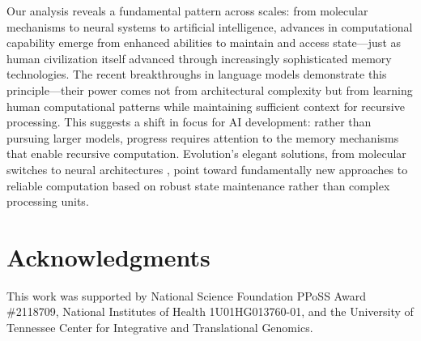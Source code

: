 \documentclass[12pt]{article}
\begin{document}
Our analysis reveals a fundamental pattern across scales: from molecular mechanisms to neural systems to artificial intelligence, advances in computational capability emerge from enhanced abilities to maintain and access state---just as human civilization itself advanced through increasingly sophisticated memory technologies.
The recent breakthroughs in language models demonstrate this principle---their power comes not from architectural complexity but from learning human computational patterns while maintaining sufficient context for recursive processing.
This suggests a shift in focus for AI development: rather than pursuing larger models, progress requires attention to the memory mechanisms that enable recursive computation.
Evolution's elegant solutions, from molecular switches to neural architectures \cite{burrill2010making}, point toward fundamentally new approaches to reliable computation based on robust state maintenance rather than complex processing units.

\section*{Acknowledgments}
This work was supported by National Science Foundation PPoSS Award \#2118709, National Institutes of Health 1U01HG013760-01, and the University of Tennessee Center for Integrative and Translational Genomics.

\begingroup
\footnotesize


\endgroup
\end{document}
